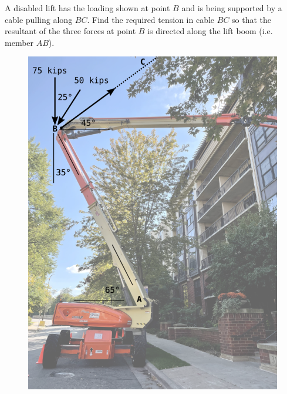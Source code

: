 
A disabled lift has the loading shown at point $B$ and is being supported by a cable pulling along $BC$.  Find the required tension in cable $BC$ so that the resultant of the three forces at point $B$ is directed along the lift boom (i.e. member $AB$).

\begin{figure}[ht!]
  \centering
  \includegraphics[height=0.3\textheight]{fig.png}
\end{figure}

